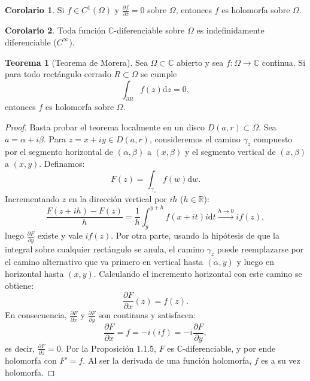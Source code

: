 \documentclass[11pt,a4paper]{article}
\theoremstyle{definition}
\newtheorem{teorema}{Teorema}[section]
\newtheorem{corolario}{Corolario}[section]
\theoremstyle{remark}
\numberwithin{equation}{section}
\newcommand{\dz}{\mathrm{d}z}
\newcommand{\dw}{\mathrm{d}w}
\newcommand{\dt}{\mathrm{d}t}
\begin{document}
\begin{corolario}
Si $f \in C^1(\Omega)$ y $\frac{\partial f}{\partial \bar{z}} = 0$ sobre $\Omega$, entonces $f$ es holomorfa sobre $\Omega$.
\end{corolario}

\begin{corolario}
Toda función $\mathbb{C}$-diferenciable sobre $\Omega$ es indefinidamente diferenciable ($C^\infty$).
\end{corolario}

\begin{teorema}[Teorema de Morera]
Sea $\Omega \subset \mathbb{C}$ abierto y sea $f: \Omega \to \mathbb{C}$ continua. Si para todo rectángulo cerrado $R \subset \Omega$ se cumple
\begin{equation}
\int_{\partial R} f(z) \dz = 0,
\end{equation}
entonces $f$ es holomorfa sobre $\Omega$.
\end{teorema}
\begin{proof}
Basta probar el teorema localmente en un disco $D(a,r) \subset \Omega$. Sea $a = \alpha + i\beta$. Para $z = x+iy \in D(a,r)$, consideremos el camino $\gamma_z$ compuesto por el segmento horizontal de $(\alpha,\beta)$ a $(x,\beta)$ y el segmento vertical de $(x,\beta)$ a $(x,y)$. Definamos:
\[
F(z) = \int_{\gamma_z} f(w) \dw.
\]
Incrementando $z$ en la dirección vertical por $ih$ ($h \in \mathbb{R}$):
\[
\frac{F(z+ih) - F(z)}{h} = \frac{1}{h} \int_y^{y+h} f(x+it) i\dt \xrightarrow{h \to 0} i f(z),
\]
luego $\frac{\partial F}{\partial y}$ existe y vale $i f(z)$.
Por otra parte, usando la hipótesis de que la integral sobre cualquier rectángulo se anula, el camino $\gamma_z$ puede reemplazarse por el camino alternativo que va primero en vertical hasta $(\alpha,y)$ y luego en horizontal hasta $(x,y)$. Calculando el incremento horizontal con este camino se obtiene:
\[
\frac{\partial F}{\partial x}(z) = f(z).
\]
En consecuencia, $\frac{\partial F}{\partial x}$ y $\frac{\partial F}{\partial y}$ son continuas y satisfacen:
\[
\frac{\partial F}{\partial x} = f = -i(if) = -i \frac{\partial F}{\partial y},
\]
es decir, $\frac{\partial F}{\partial \bar{z}} = 0$. Por la Proposición 1.1.5, $F$ es $\mathbb{C}$-diferenciable, y por ende holomorfa con $F' = f$. Al ser la derivada de una función holomorfa, $f$ es a su vez holomorfa.
\end{proof}
\end{document}

